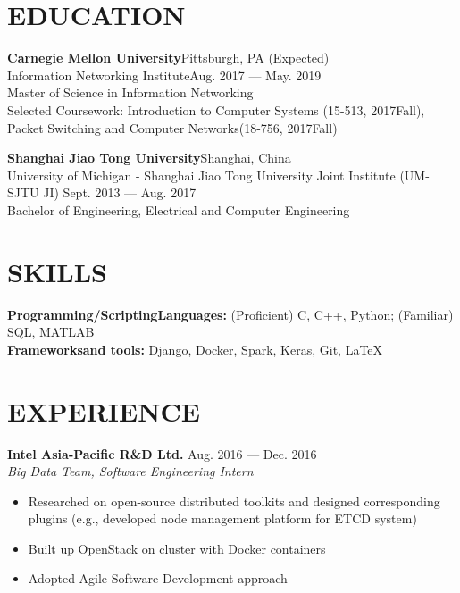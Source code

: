 \documentclass[margin,line,10pt]{res}
\begin{document}
\address{ $\bullet$ linkedin.com/in/hao-wu-710254128 $\bullet$ wu.hao.cz.21@gmail.com $\bullet$ (412)-616-6280}
 
\begin{resume}

\section{EDUCATION}
{
\small
\textbf{Carnegie Mellon University}\hfill Pittsburgh, PA (Expected) \\ Information Networking Institute\hfill Aug. 2017 --- May. 2019\\
Master of Science in Information Networking\\
{\small Selected Coursework: Introduction to Computer Systems (15-513, 2017Fall), Packet Switching and Computer Networks(18-756, 2017Fall)} 
}

{
\small
\textbf{Shanghai Jiao Tong University}\hfill Shanghai, China \\
University of Michigan - Shanghai Jiao Tong University Joint Institute (UM-SJTU JI) \hfill Sept. 2013 --- Aug. 2017\\
Bachelor of Engineering, Electrical and Computer Engineering
}

\section{SKILLS}
{\small \textbf{Programming/ScriptingLanguages:} (Proficient) C, C++, Python; (Familiar) SQL, MATLAB}\\
{\small \textbf{Frameworksand tools:} Django, Docker, Spark, Keras, Git, \LaTeX}

\section{EXPERIENCE}
{\small
{\bf\normalsize Intel Asia-Pacific R\&D Ltd.} \hfill Aug. 2016 --- Dec. 2016 \\
{\it Big Data Team, Software Engineering Intern} 
}
\begin{itemize}
\setlength{\itemsep}{0pt}
\setlength{\parskip}{0pt}
\setlength{\parsep}{0pt}
\item {\small Researched on open-source distributed toolkits and designed corresponding plugins (e.g., developed node management platform for ETCD system)}
\item {\small Built up OpenStack on cluster with Docker containers}
\item {\small Adopted Agile Software Development approach}
\end{itemize}


\end{resume}
\end{document}
